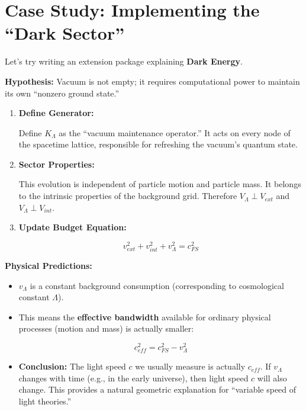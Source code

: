 \documentclass[11pt,a4paper,twoside]{book}
\begin{document}
\section{Case Study: Implementing the ``Dark Sector''}

Let's try writing an extension package explaining \textbf{Dark Energy}.

\textbf{Hypothesis:} Vacuum is not empty; it requires computational power to maintain its own ``nonzero ground state.''

\begin{enumerate}
\item \textbf{Define Generator:}

Define \textbf{$K_{\Lambda}$} as the ``vacuum maintenance operator.'' It acts on every node of the spacetime lattice, responsible for refreshing the vacuum's quantum state.

\item \textbf{Sector Properties:}

This evolution is independent of particle motion and particle mass. It belongs to the intrinsic properties of the background grid. Therefore \textbf{$V_{\Lambda} \perp V_{ext}$} and \textbf{$V_{\Lambda} \perp V_{int}$}.

\item \textbf{Update Budget Equation:}

$$v_{ext}^2 + v_{int}^2 + v_{\Lambda}^2 = c_{FS}^2$$
\end{enumerate}

\textbf{Physical Predictions:}

\begin{itemize}
\item \textbf{$v_{\Lambda}$} is a constant background consumption (corresponding to cosmological constant $\Lambda$).

\item This means the \textbf{effective bandwidth} available for ordinary physical processes (motion and mass) is actually smaller:

$$c_{eff}^2 = c_{FS}^2 - v_{\Lambda}^2$$

\item \textbf{Conclusion:} The light speed $c$ we usually measure is actually $c_{eff}$. If $v_{\Lambda}$ changes with time (e.g., in the early universe), then light speed $c$ will also change. This provides a natural geometric explanation for ``variable speed of light theories.''
\end{itemize}
\end{document}
